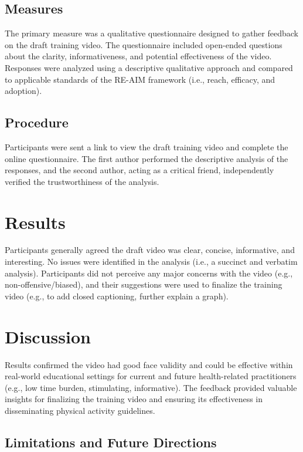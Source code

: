 \documentclass[
  man,
  longtable,
  nolmodern,
  notxfonts,
  notimes,
  colorlinks=true,linkcolor=blue,citecolor=blue,urlcolor=blue]{apa7}
\begin{document}
\subsection{Measures}\label{measures}

The primary measure was a qualitative questionnaire designed to gather
feedback on the draft training video. The questionnaire included
open-ended questions about the clarity, informativeness, and potential
effectiveness of the video. Responses were analyzed using a descriptive
qualitative approach and compared to applicable standards of the RE-AIM
framework (i.e., reach, efficacy, and adoption).

\subsection{Procedure}\label{procedure}

Participants were sent a link to view the draft training video and
complete the online questionnaire. The first author performed the
descriptive analysis of the responses, and the second author, acting as
a critical friend, independently verified the trustworthiness of the
analysis.

\section{Results}\label{results}

Participants generally agreed the draft video was clear, concise,
informative, and interesting. No issues were identified in the analysis
(i.e., a succinct and verbatim analysis). Participants did not perceive
any major concerns with the video (e.g., non-offensive/biased), and
their suggestions were used to finalize the training video (e.g., to add
closed captioning, further explain a graph).

\section{Discussion}\label{discussion}

Results confirmed the video had good face validity and could be
effective within real-world educational settings for current and future
health-related practitioners (e.g., low time burden, stimulating,
informative). The feedback provided valuable insights for finalizing the
training video and ensuring its effectiveness in disseminating physical
activity guidelines.

\subsection{Limitations and Future
Directions}\label{limitations-and-future-directions}
\end{document}
